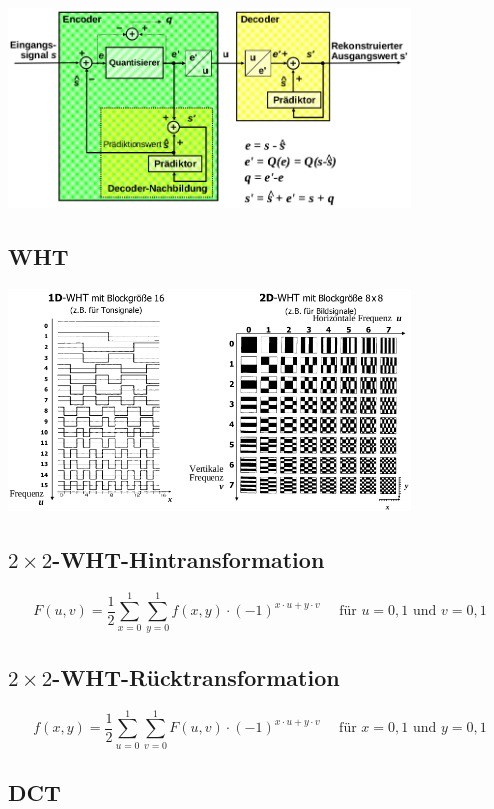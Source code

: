\includegraphics[width=0.8\textwidth]{dpcm}

\subsection*{WHT}

\includegraphics[width=0.8\textwidth]{wht}

\subsection*{$2 \times 2$-WHT-Hintransformation}
\[
    F(u, v) = \frac{1}{2} \sum_{x=0}^{1} \sum_{y=0}^{1} f(x, y) \cdot {(-1)}^{x \cdot u + y \cdot v}
        \quad \mbox{ für } u = 0, 1 \mbox{ und } v = 0, 1
\]

\subsection*{$2 \times 2$-WHT-Rücktransformation}
\[
    f(x, y) = \frac{1}{2} \sum_{u=0}^{1} \sum_{v=0}^{1} F(u, v) \cdot {(-1)}^{x \cdot u + y \cdot v}
        \quad \mbox{ für } x = 0, 1 \mbox{ und } y = 0, 1
\]

\subsection*{DCT}

